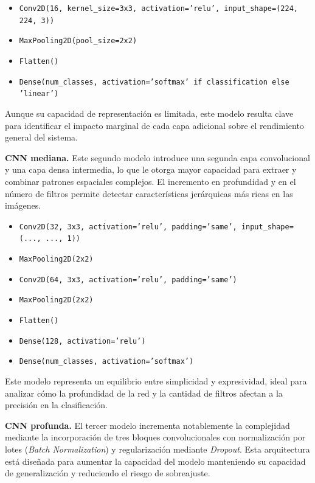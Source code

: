 \documentclass[11pt,spanish,listoffigures,listoftables]{tfgetsinf}
\begin{document}
\begin{itemize}
    \item \texttt{Conv2D(16, kernel\_size=3x3, activation='relu', input\_shape=(224, 224, 3))}
    \item \texttt{MaxPooling2D(pool\_size=2x2)}
    \item \texttt{Flatten()}
    \item \texttt{Dense(num\_classes, activation='softmax' if classification else 'linear')}
\end{itemize}

Aunque su capacidad de representación es limitada, este modelo resulta clave para identificar el impacto marginal 
de cada capa adicional sobre el rendimiento general del sistema.

\textbf{CNN mediana.}  
Este segundo modelo introduce una segunda capa convolucional y una capa densa intermedia, lo que le otorga mayor capacidad 
para extraer y combinar patrones espaciales complejos. El incremento en profundidad y en el número de filtros permite detectar 
características jerárquicas más ricas en las imágenes.

\begin{itemize}
    \item \texttt{Conv2D(32, 3x3, activation='relu', padding='same', input\_shape=(..., ..., 1))}
    \item \texttt{MaxPooling2D(2x2)}
    \item \texttt{Conv2D(64, 3x3, activation='relu', padding='same')}
    \item \texttt{MaxPooling2D(2x2)}
    \item \texttt{Flatten()}
    \item \texttt{Dense(128, activation='relu')}
    \item \texttt{Dense(num\_classes, activation='softmax')}
\end{itemize}

Este modelo representa un equilibrio entre simplicidad y expresividad, ideal para analizar cómo la profundidad de la red y 
la cantidad de filtros afectan a la precisión en la clasificación.

\textbf{CNN profunda.}  
El tercer modelo incrementa notablemente la complejidad mediante la incorporación de tres bloques convolucionales con 
normalización por lotes (\textit{Batch Normalization}) y regularización mediante \textit{Dropout}. Esta arquitectura 
está diseñada para aumentar la capacidad del modelo manteniendo su capacidad de generalización y reduciendo el riesgo 
de sobreajuste.
\end{document}
